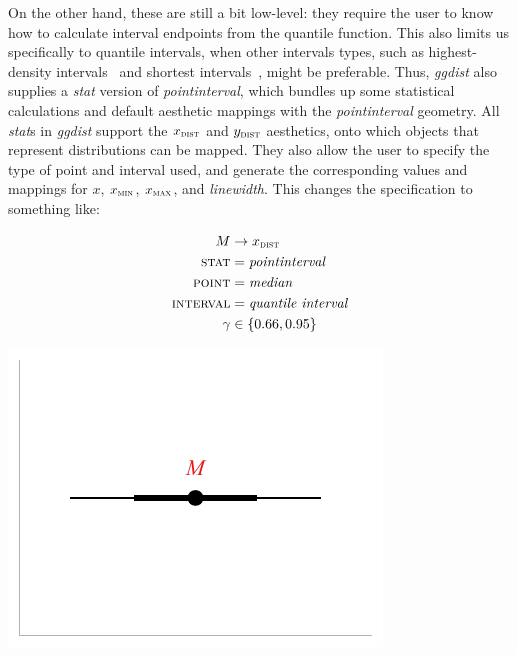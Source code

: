 \documentclass[journal]{vgtc}                     %
\begin{document}
On the other hand, these are still a bit low-level: they require the user to know how to calculate interval endpoints from the quantile function. This also limits us specifically to quantile intervals, when other intervals types, such as highest-density intervals~\cite{hyndman1996computing} and shortest intervals~\cite{liu2015spi}, might be preferable. Thus, \textit{ggdist} also supplies a \textit{stat} version of \textit{pointinterval}, which bundles up some statistical calculations and default aesthetic mappings with the \textit{pointinterval} geometry. All \textit{stat}s in \textit{ggdist} support the $x_\textsc{dist}$ and $y_\textsc{dist}$ aesthetics, onto which objects that represent distributions can be mapped. They also allow the user to specify the type of point and interval used, and generate the corresponding values and mappings for $x$, $x_\textsc{min}$, $x_\textsc{max}$, and \textit{linewidth}. This changes the specification to something like:


\noindent
\begin{minipage}{.5\columnwidth}

\begin{align*}
M &\rightarrow x_\textsc{dist}\\
\textsc{stat} &= \mathit{pointinterval}\\
\textsc{point} &= \mathit{median}\\
\textsc{interval} &= \textit{quantile interval}\\
\gamma &\in \{0.66, 0.95\}
\end{align*}
\end{minipage}%
  \begin{minipage}{.4\columnwidth}
    \centering
    \includegraphics[width=1.2\columnwidth]{figs/3-stat_pointinterval_A.pdf}
  \end{minipage}
\hfill\break
\end{document}
